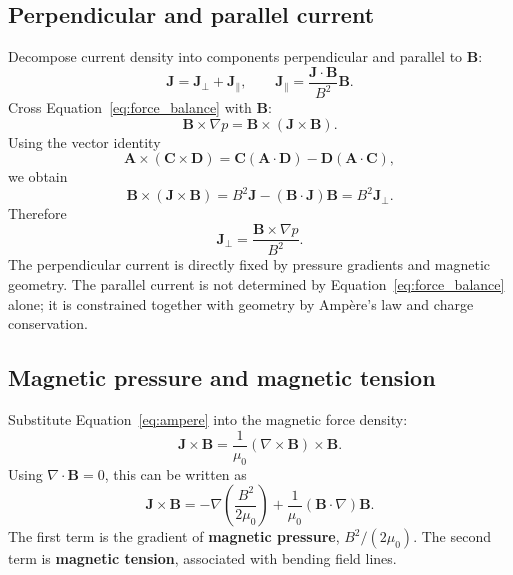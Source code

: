 \subsection{Perpendicular and parallel current}
Decompose current density into components perpendicular and parallel to $\mathbf B$:
\begin{equation}
\mathbf J=\mathbf J_\perp+\mathbf J_\parallel,
\qquad
\mathbf J_\parallel=\frac{\mathbf J\cdot\mathbf B}{B^2}\mathbf B.
\end{equation}
Cross Equation~\eqref{eq:force_balance} with $\mathbf B$:
\begin{equation}
\mathbf B\times\nabla p
=\mathbf B\times(\mathbf J\times\mathbf B).
\end{equation}
Using the vector identity
\begin{equation}
\mathbf A\times(\mathbf C\times\mathbf D)
=\mathbf C(\mathbf A\cdot\mathbf D)-\mathbf D(\mathbf A\cdot\mathbf C),
\end{equation}
we obtain
\begin{equation}
\mathbf B\times(\mathbf J\times\mathbf B)
=B^2\mathbf J-(\mathbf B\cdot\mathbf J)\mathbf B
=B^2\mathbf J_\perp.
\end{equation}
Therefore
\begin{equation}
\boxed{\mathbf J_\perp=\frac{\mathbf B\times\nabla p}{B^2}.}
\label{eq:Jperp}
\end{equation}
The perpendicular current is directly fixed by pressure gradients and magnetic geometry. The parallel current is not determined by Equation~\eqref{eq:force_balance} alone; it is constrained together with geometry by Amp\`ere's law and charge conservation.

\subsection{Magnetic pressure and magnetic tension}
Substitute Equation~\eqref{eq:ampere} into the magnetic force density:
\begin{equation}
\mathbf J\times\mathbf B
=\frac{1}{\mu_0}(\nabla\times\mathbf B)\times\mathbf B.
\end{equation}
Using $\nabla\cdot\mathbf B=0$, this can be written as
\begin{equation}
\mathbf J\times\mathbf B
=-\nabla\left(\frac{B^2}{2\mu_0}\right)
+\frac{1}{\mu_0}(\mathbf B\cdot\nabla)\mathbf B.
\label{eq:magnetic_force_decomposition}
\end{equation}
The first term is the gradient of \textbf{magnetic pressure}, $B^2/(2\mu_0)$. The second term is \textbf{magnetic tension}, associated with bending field lines.

